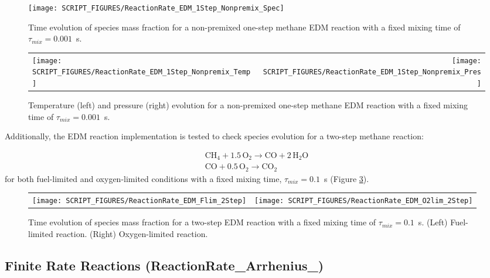 \documentclass[11pt]{book}
\begin{document}
\begin{figure}[ht]
\begin{center}
\texttt{[image: SCRIPT\_FIGURES/ReactionRate\_EDM\_1Step\_Nonpremix\_Spec]}
\caption[Species Evolution in Mixing Controlled Reaction]{Time evolution of species mass fraction for a non-premixed one-step methane EDM reaction with a fixed mixing time of $\tau_{mix}=0.001$~s. }
\label{fig:EDM_methan_nonpremix_spec}
\end{center}
\end{figure}

\begin{figure}[ht]
\begin{tabular*}{\textwidth}{lr}
\texttt{[image: SCRIPT\_FIGURES/ReactionRate\_EDM\_1Step\_Nonpremix\_Temp]} &
\texttt{[image: SCRIPT\_FIGURES/ReactionRate\_EDM\_1Step\_Nonpremix\_Pres]}
\end{tabular*}
\caption[Temperature Evolution in Mixing Controlled Reaction]{Temperature (left) and pressure (right) evolution for a non-premixed one-step methane EDM reaction with a fixed mixing time of $\tau_{mix}=0.001$~s.}
\label{fig:EDM_methan_nonpremix_TempPres}
\end{figure}

Additionally, the EDM reaction implementation is tested to check species evolution for a two-step methane reaction:

\begin{eqnarray}\label{eq:2step_methane}
\mathrm{CH_4 + 1.5 \, O_2 \rightarrow  CO + 2 \, H_2O} \\
\nonumber \mathrm{CO + 0.5 \, O_2 \rightarrow CO_2}
\end{eqnarray}
for both fuel-limited and oxygen-limited conditions with a fixed mixing time, $\tau_{mix}=0.1$~s (Figure \ref{fig:EDM_2Step}).

\begin{figure}[ht]
\begin{tabular*}{\textwidth}{lr}
\texttt{[image: SCRIPT\_FIGURES/ReactionRate\_EDM\_Flim\_2Step]} &
\texttt{[image: SCRIPT\_FIGURES/ReactionRate\_EDM\_O2lim\_2Step]}
\end{tabular*}
\caption[Species Evolution in EDM Reaction]{Time evolution of species mass fraction for a two-step EDM reaction with a fixed mixing time of $\tau_{mix}=0.1$~s. (Left) Fuel-limited reaction. (Right) Oxygen-limited reaction.}
\label{fig:EDM_2Step}
\end{figure}

\subsection{Finite Rate Reactions (ReactionRate\_Arrhenius\_)}
\end{document}
